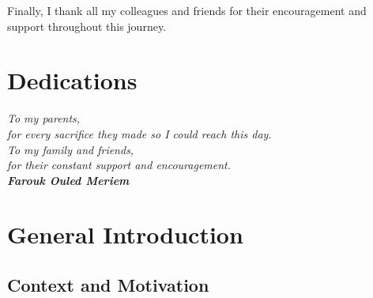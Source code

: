 \documentclass[12pt,a4paper]{report}
\begin{document}
\vspace{0.5cm}
Finally, I thank all my colleagues and friends for their encouragement
and support throughout this journey.


\newpage
\chapter*{Dedications}

\vspace{2.5cm}

\begin{center}
  \itshape\large
  To my parents,\\[8pt]
  for every sacrifice they made so I could reach this day.\\[24pt]

  To my family and friends,\\[8pt]
  for their constant support and encouragement.\\[24pt]

  \upshape\normalsize\textbf{Farouk Ouled Meriem}
\end{center}


\newpage
\tableofcontents
\newpage
\listoffigures
\newpage
\listoftables


\newpage
{}

\chapter*{General Introduction}

\section*{Context and Motivation}
\end{document}

